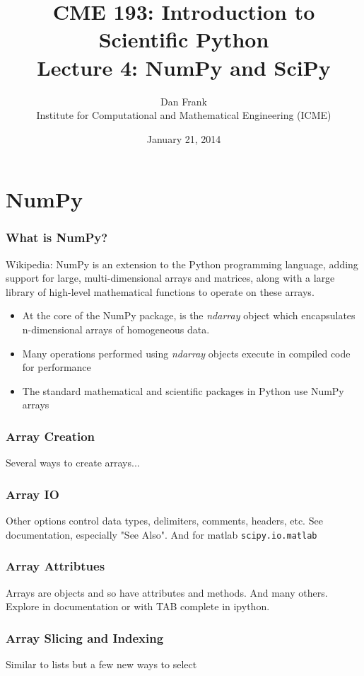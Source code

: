 \documentclass{beamer}
\title{CME 193: Introduction to Scientific Python \\
Lecture 4: NumPy and SciPy}
\author{
Dan Frank \\
\vspace{0.1in}
Institute for Computational and Mathematical Engineering (ICME)}
\date{January 21, 2014}
\begin{document}
\maketitle

\section{NumPy}

\begin{frame}
\frametitle{What is NumPy?}

Wikipedia: NumPy is an extension to the Python programming language, adding support for large, multi-dimensional arrays and matrices, along with a large library of high-level mathematical functions to operate on these arrays.

\begin{itemize}
\setlength{\itemsep}{0.1in}
\item{At the core of the NumPy package, is the \textit{ndarray} object which encapsulates n-dimensional arrays of homogeneous data. 
}
\item{Many operations performed using \textit{ndarray} objects execute in compiled code for performance}
\item{The standard mathematical and scientific packages in Python use NumPy arrays}
\end{itemize}
\end{frame}

\begin{frame}
\frametitle{Array Creation}
Several ways to create arrays...
\lstset{basicstyle=\scriptsize}
\end{frame}

\begin{frame}
\frametitle{Array IO}
\lstset{basicstyle=\small}
Other options control data types, delimiters, comments, headers, etc.
See documentation, especially "See Also". And for matlab \texttt{scipy.io.matlab}
\end{frame}

\begin{frame}
\frametitle{Array Attribtues}
Arrays are objects and so have attributes and methods.
And many others. Explore in documentation or with TAB complete in ipython.
\end{frame}


\begin{frame}
\frametitle{Array Slicing and Indexing}
Similar to lists but a few new ways to select
\lstset{basicstyle=\scriptsize}
\end{frame}
\end{document}
